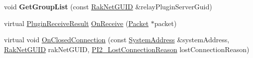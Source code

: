 \begin{DoxyCompactItemize}
\item 
\hypertarget{class_rak_net_1_1_relay_plugin_a3669a3796f9e667f097e127a4ebff12a}{void {\bfseries Get\-Group\-List} (const \hyperlink{struct_rak_net_1_1_rak_net_g_u_i_d}{Rak\-Net\-G\-U\-I\-D} \&relay\-Plugin\-Server\-Guid)}\label{class_rak_net_1_1_relay_plugin_a3669a3796f9e667f097e127a4ebff12a}

\item 
virtual \hyperlink{group___p_l_u_g_i_n___i_n_t_e_r_f_a_c_e___g_r_o_u_p_ga89998adaafb29e5d879113b992161085}{Plugin\-Receive\-Result} \hyperlink{class_rak_net_1_1_relay_plugin_ae9eed4316b23891897d8bdf952a45618}{On\-Receive} (\hyperlink{struct_rak_net_1_1_packet}{Packet} $\ast$packet)
\item 
virtual void \hyperlink{class_rak_net_1_1_relay_plugin_a11626f8a60483c9bd41fbc2bef86b85a}{On\-Closed\-Connection} (const \hyperlink{struct_rak_net_1_1_system_address}{System\-Address} \&system\-Address, \hyperlink{struct_rak_net_1_1_rak_net_g_u_i_d}{Rak\-Net\-G\-U\-I\-D} rak\-Net\-G\-U\-I\-D, \hyperlink{group___p_l_u_g_i_n___i_n_t_e_r_f_a_c_e___g_r_o_u_p_ga376cc546fd6892c2ead48cd51796c8b8}{P\-I2\-\_\-\-Lost\-Connection\-Reason} lost\-Connection\-Reason)
\end{DoxyCompactItemize}
